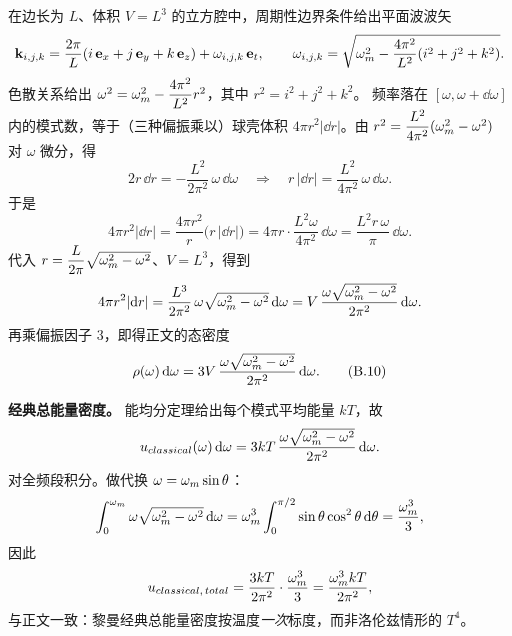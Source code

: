 在边长为 $L$、体积 $V=L^{3}$ 的立方腔中，周期性边界条件给出平面波波矢
\begin{equation}
\mathbf{k}_{i,j,k}=\frac{2\pi}{L}(i\,\mathbf{e}_{x}+j\,\mathbf{e}_{y}+k\,\mathbf{e}_{z})+\omega_{i,j,k}\,\mathbf{e}_{t},
\qquad
\omega_{i,j,k}=\sqrt{\omega_m^{2}-\frac{4\pi^{2}}{L^{2}}(i^{2}+j^{2}+k^{2})} .
\end{equation}
色散关系给出 $\omega^{2}=\omega_m^{2}-\dfrac{4\pi^{2}}{L^{2}}r^{2}$，其中 $r^{2}=i^{2}+j^{2}+k^{2}$。
频率落在 $[\omega,\omega+\dd\omega]$ 内的模式数，等于（三种偏振乘以）球壳体积
$4\pi r^{2}|\dd r|$。由 $r^{2}=\dfrac{L^{2}}{4\pi^{2}}(\omega_m^{2}-\omega^{2})$ 对 $\omega$
微分，得
\begin{equation}
2r\,\dd r=-\frac{L^{2}}{2\pi^{2}}\,\omega\,\dd\omega
\quad\Longrightarrow\quad
r\,|\dd r|=\frac{L^{2}}{4\pi^{2}}\,\omega\,\dd\omega .
\end{equation}
于是
\begin{equation}
4\pi r^{2}|\dd r|=\frac{4\pi r^{2}}{r}\bigl(r\,|\dd r|\bigr)
=4\pi r\cdot\frac{L^{2}\omega}{4\pi^{2}}\,\dd\omega
=\frac{L^{2}r\,\omega}{\pi}\,\dd\omega .
\end{equation}
代入 $r=\dfrac{L}{2\pi}\sqrt{\omega_m^{2}-\omega^{2}}$、$V=L^{3}$，得到
\begin{equation}
4\pi r^{2}|\mathrm{d} r| = \frac{L^{3}}{2\pi^{2}}\,\omega\sqrt{\omega_m^{2}-\omega^{2}}\,\mathrm{d}\omega
= V\,\frac{\omega\sqrt{\omega_m^{2}-\omega^{2}}}{2\pi^{2}}\,\mathrm{d}\omega .
\end{equation}
再乘偏振因子 $3$，即得正文的态密度
\begin{equation}
\rho(\omega)\,\mathrm{d}\omega=3V\,\frac{\omega\sqrt{\omega_m^{2}-\omega^{2}}}{2\pi^{2}}\,\mathrm{d}\omega .
\tag{B.10}
\end{equation}

\textbf{经典总能量密度。} 能均分定理给出每个模式平均能量 $kT$，故
\begin{equation}
u_{classical}(\omega)\,\mathrm{d}\omega=3kT\,\frac{\omega\sqrt{\omega_m^{2}-\omega^{2}}}{2\pi^{2}}\,\mathrm{d}\omega .
\end{equation}
对全频段积分。做代换 $\omega=\omega_m\sin\theta$：
\begin{equation}
\int_{0}^{\omega_m}\omega\sqrt{\omega_m^{2}-\omega^{2}}\,\mathrm{d}\omega
=\omega_m^{3}\int_{0}^{\pi/2}\sin\theta\cos^{2}\theta\,\mathrm{d}\theta
=\frac{\omega_m^{3}}{3},
\end{equation}
因此
\begin{equation}
u_{classical,\,total}=\frac{3kT}{2\pi^{2}}\cdot\frac{\omega_m^{3}}{3}=\frac{\omega_m^{3}kT}{2\pi^{2}},
\end{equation}
与正文一致：黎曼经典总能量密度按温度\emph{一次}标度，而非洛伦兹情形的 $T^{4}$。

